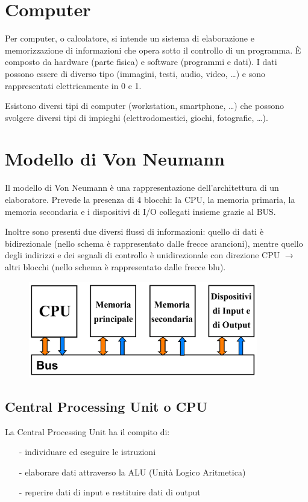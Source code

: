 \documentclass[a4paper]{article}
\begin{document}
\newpage


\section{Computer}
Per computer, o calcolatore, si intende un sistema di elaborazione e memorizzazione di informazioni che opera sotto
il controllo di un programma. È composto da hardware (parte fisica) e software (programmi e dati). I dati possono
essere di diverso tipo (immagini, testi, audio, video, \dots) e sono rappresentati elettricamente in 0 e 1.

Esistono diversi tipi di computer (workstation, smartphone, \dots) che possono svolgere diversi tipi di impieghi
(elettrodomestici, giochi, fotografie, \dots).


\section{Modello di Von Neumann}
Il modello di Von Neumann è una rappresentazione dell'architettura di un elaboratore. Prevede la presenza di 4 blocchi:
la CPU, la memoria primaria, la memoria secondaria e i dispositivi di I/O collegati insieme grazie al BUS.

Inoltre sono presenti due diversi flussi di informazioni: quello di dati è bidirezionale (nello schema è rappresentato
dalle frecce arancioni), mentre quello degli indirizzi e dei segnali di controllo è unidirezionale con direzione CPU
\(\rightarrow\) altri blocchi (nello schema è rappresentato dalle frecce blu).

\begin{figure}[h]
	\centering
	\includegraphics[width=10cm]{immagini/von-neumann-scheme.png}
\end{figure}

\subsection{Central Processing Unit o CPU}
La Central Processing Unit ha il compito di:
\begin{itemize}[topsep=3pt, itemsep=0pt]
	\item[-] individuare ed eseguire le istruzioni
	\item[-] elaborare dati attraverso la ALU (Unità Logico Aritmetica)
	\item[-] reperire dati di input e restituire dati di output
\end{itemize}
\end{document}
